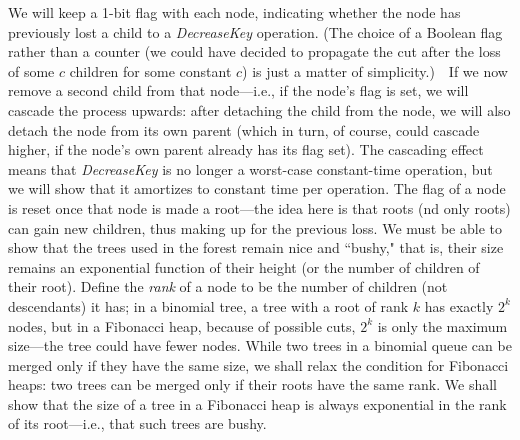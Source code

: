 \documentclass[11pt]{article}
\begin{document}
We will keep a 1-bit flag with each node, indicating whether the node has
previously lost a child to a \emph{DecreaseKey} operation.
(The choice of a Boolean flag rather than a counter (we could have decided
to propagate the cut after the loss of some $c$ children for some constant $c$)
is just a matter of simplicity.)\ \ If we now remove
a second child from that node---i.e., if the node's flag is set, we will
cascade the process upwards: after detaching the child from the node,
we will also detach the node from its own parent (which in turn, of course,
could cascade higher, if the node's own parent already has its flag set).
The cascading effect means that \emph{DecreaseKey} is no longer a worst-case
constant-time operation, but we will show that it amortizes to constant time
per operation.  The flag of a node is reset once that node is made
a root---the idea here is that roots (nd only roots) can gain new children,
thus making up for the previous loss.
We must be able to show that the trees used in the forest remain
nice and ``bushy," that is, their size remains an exponential function
of their height (or the number of children of their root).
Define the \emph{rank} of a node to be the number of children (not
descendants) it has; in a binomial tree, a tree with a root of rank $k$
has exactly $2^k$ nodes, but in a Fibonacci heap, because of possible cuts,
$2^k$ is only the maximum size---the tree could have fewer nodes.
While two trees in a binomial queue can be merged only if they have
the same size, we shall relax the condition for Fibonacci heaps: two
trees can be merged only if their roots have the same rank.
We shall show that the size of a tree in a Fibonacci heap is always
exponential in the rank of its root---i.e., that such trees are bushy.
\end{document}
